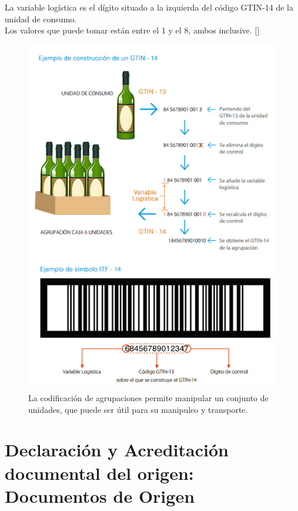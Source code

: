 La variable logística es el dígito situado a la izquierda del código GTIN-14 de la unidad de consumo.\\

Los valores que puede tomar están entre el 1 y el 8, ambos inclusive. [\citep{CCCB:2019:Online}]

\begin{figure}
  \centering
    \includegraphics[scale=0.8]{./Capitulo2/figs/codificacion_agrupaciones_post_barras.jpg}
  \caption{La codificación de agrupaciones permite manipular un conjunto de unidades, que puede ser útil para su manipuleo y transporte.}
  \label{codificacion_agrupaciones_post_barras}
\end{figure}

\section{Declaración y Acreditación documental del origen: Documentos de Origen}

